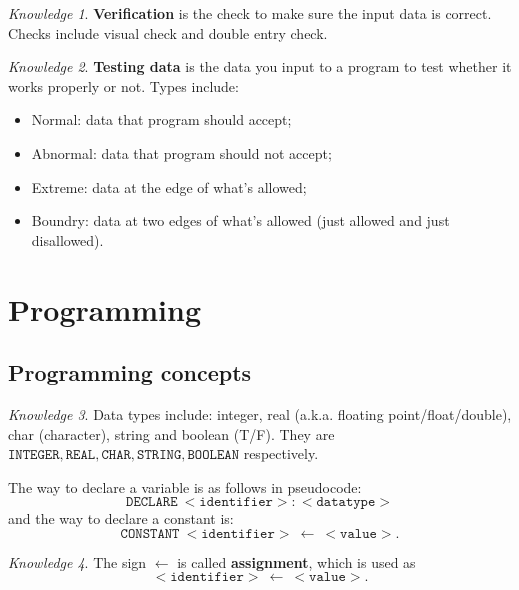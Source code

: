 \documentclass[8pt]{article}
\theoremstyle{remark}
\newtheorem{knowledge}{Knowledge}[subsection]
\begin{document}
        \begin{knowledge}
            \textbf{Verification} is the check to make sure the input data is correct. Checks include visual check and double entry check.
        \end{knowledge}

        \begin{knowledge}
            \textbf{Testing data} is the data you input to a program to test whether it works properly or not. Types include:
            \begin{itemize}
                \item Normal: data that program should accept;
                \item Abnormal: data that program should not accept;
                \item Extreme: data at the edge of what's allowed;
                \item Boundry: data at two edges of what's allowed (just allowed and just disallowed).
            \end{itemize}
        \end{knowledge}

    \section{Programming}
        \subsection{Programming concepts}
            \begin{knowledge}
                Data types include: integer, real (a.k.a. floating point/float/double), char (character), string and boolean (T/F). They are \(\mathtt{INTEGER}, \mathtt{REAL}, \mathtt{CHAR}, \mathtt{STRING}, \mathtt{BOOLEAN}\) respectively.

                The way to declare a variable is as follows in pseudocode:
                \[
                    \mathtt{DECLARE\ <identifier>:<datatype>}
                \]
                and the way to declare a constant is:
                \[
                    \mathtt{CONSTANT\ <identifier>\ \leftarrow\ <value>}.
                \]
            \end{knowledge}
        
            \begin{knowledge}
                The sign $\leftarrow$ is called \textbf{assignment}, which is used as
                \[
                    \mathtt{<identifier>\ \leftarrow\ <value>}.
                \]
            \end{knowledge}
\end{document}
